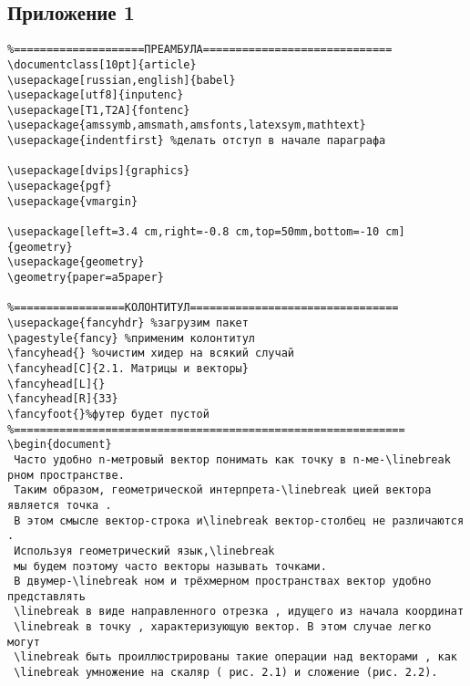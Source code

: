 \documentclass[a4paper,12pt]{article}
\begin{document}
\newpage

\begin{flushright}

\section{Приложение 1}
\end{flushright}
\newpage
\setcounter{page}{11} 
\begin{verbatim}
%====================ПРЕАМБУЛА=============================
\documentclass[10pt]{article}
\usepackage[russian,english]{babel}
\usepackage[utf8]{inputenc}
\usepackage[T1,T2A]{fontenc}
\usepackage{amssymb,amsmath,amsfonts,latexsym,mathtext}
\usepackage{indentfirst} %делать отступ в начале параграфа

\usepackage[dvips]{graphics}
\usepackage{pgf}
\usepackage{vmargin}

\usepackage[left=3.4 cm,right=-0.8 cm,top=50mm,bottom=-10 cm]{geometry} 
\usepackage{geometry}
\geometry{paper=a5paper}

%=================КОЛОНТИТУЛ================================
\usepackage{fancyhdr} %загрузим пакет
\pagestyle{fancy} %применим колонтитул
\fancyhead{} %очистим хидер на всякий случай
\fancyhead[C]{2.1. Матрицы и векторы}
\fancyhead[L]{} 
\fancyhead[R]{33} 
\fancyfoot{}%футер будет пустой
%============================================================
\begin{document}
 Часто удобно n-метровый вектор понимать как точку в n-ме-\linebreak рном пространстве. 
 Таким образом, геометрической интерпрета-\linebreak цией вектора является точка .
 В этом смысле вектор-строка и\linebreak вектор-столбец не различаются .
 Используя геометрический язык,\linebreak    
 мы будем поэтому часто векторы называть точками. 
 В двумер-\linebreak ном и трёхмерном пространствах вектор удобно представлять
 \linebreak в виде направленного отрезка , идущего из начала координат
 \linebreak в точку , характеризующую вектор. В этом случае легко могут
 \linebreak быть проиллюстрированы такие операции над векторами , как
 \linebreak умножение на скаляр ( рис. 2.1) и сложение (рис. 2.2).


\end{verbatim}
\end{document}
